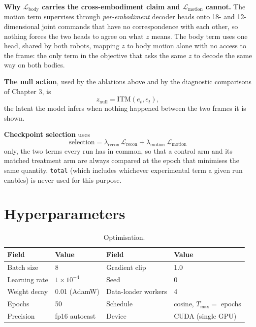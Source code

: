 \documentclass[12pt,a4paper,oneside]{report}
\begin{document}
\noindent\textbf{Why $\mathcal{L}_{\text{body}}$ carries the cross-embodiment claim and
$\mathcal{L}_{\text{motion}}$ cannot.} The motion term supervises through \emph{per-embodiment}
decoder heads onto 18- and 12-dimensional joint commands that have no correspondence with each other,
so nothing forces the two heads to agree on what $z$ means. The body term uses one head, shared by
both robots, mapping $z$ to body motion alone with no access to the frame: the only term in the
objective that asks the same $z$ to decode the same way on both bodies.

\noindent\textbf{The null action}, used by the ablations above and by the diagnostic comparisons of Chapter 3, is
\[
z_{\text{null}} = \mathrm{ITM}(e_t, e_t),
\]
the latent the model infers when nothing happened between the two frames it is shown.

\noindent\textbf{Checkpoint selection} uses
\[
\text{selection} = \lambda_{\text{recon}}\,\mathcal{L}_{\text{recon}} + \lambda_{\text{motion}}\,\mathcal{L}_{\text{motion}}
\]
only, the two terms every run has in common, so that a control arm and its matched treatment arm are always
compared at the epoch that minimises the same quantity. \texttt{total} (which includes whichever experimental
term a given run enables) is never used for this purpose.

\section{Hyperparameters}

\begin{table}[H]
\centering
\footnotesize
\caption{Optimisation.}
\label{tab:appendix-opt}
\begin{tabularx}{\textwidth}{YY|YY}
\hline
\textbf{Field} & \textbf{Value} & \textbf{Field} & \textbf{Value}\\
\hline
Batch size & 8 & Gradient clip & 1.0\\
Learning rate & $1\times10^{-4}$ & Seed & 0\\
Weight decay & 0.01 (AdamW) & Data-loader workers & 4\\
Epochs & 50 & Schedule & cosine, $T_{\max} =$ epochs\\
Precision & fp16 autocast & Device & CUDA (single GPU)\\
\hline
\end{tabularx}
\end{table}
\end{document}
